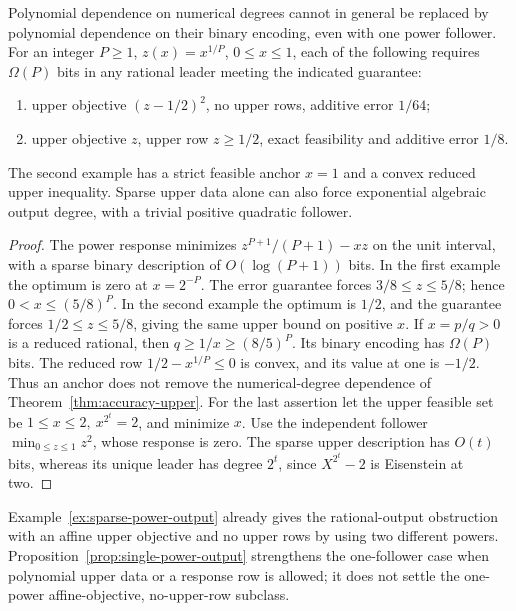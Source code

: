 \begin{proposition}
\label{prop:single-power-output}
Polynomial dependence on numerical degrees cannot in general be replaced by
polynomial dependence on their binary encoding, even with one power follower.
For an integer \(P\ge1\), \(z(x)=x^{1/P}\), \(0\le x\le1\), each of the following requires
\(\Omega(P)\) bits in any rational leader meeting the indicated guarantee:
\begin{enumerate}
\item upper objective \((z-1/2)^2\), no upper rows, additive error \(1/64\);
\item upper objective \(z\), upper row \(z\ge1/2\), exact feasibility and
additive error \(1/8\).
\end{enumerate}
The second example has a strict feasible anchor \(x=1\) and a convex reduced
upper inequality. Sparse upper data alone can also force exponential algebraic
output degree, with a trivial positive quadratic follower.
\end{proposition}
\begin{proof}
The power response minimizes \(z^{P+1}/(P+1)-xz\) on the unit interval,
with a sparse binary description of \(O(\log(P+1))\) bits.
In the first example the optimum is zero at \(x=2^{-P}\). The error guarantee
forces \(3/8\le z\le5/8\); hence \(0<x\le(5/8)^P\). In the second example
the optimum is \(1/2\), and the guarantee forces \(1/2\le z\le5/8\), giving
the same upper bound on positive \(x\). If \(x=p/q>0\) is a reduced rational,
then \(q\ge1/x\ge(8/5)^P\). Its binary encoding has \(\Omega(P)\) bits.
The reduced row \(1/2-x^{1/P}\le0\) is convex, and its value at one is
\(-1/2\). Thus an anchor does not remove the numerical-degree dependence of
Theorem~\ref{thm:accuracy-upper}.
For the last assertion let the upper feasible set be
\(1\le x\le2,\ x^{2^t}=2\), and minimize \(x\). Use the independent follower
\(\min_{0\le z\le1}z^2\), whose response is zero. The sparse upper description
has \(O(t)\) bits, whereas its unique leader has degree \(2^t\), since
\(X^{2^t}-2\) is Eisenstein at two.
\end{proof}
Example~\ref{ex:sparse-power-output} already gives the rational-output obstruction
with an affine upper objective and no upper rows by using two different powers.
Proposition~\ref{prop:single-power-output} strengthens the one-follower case
when polynomial upper data or a response row is allowed; it does not settle
the one-power affine-objective, no-upper-row subclass.

